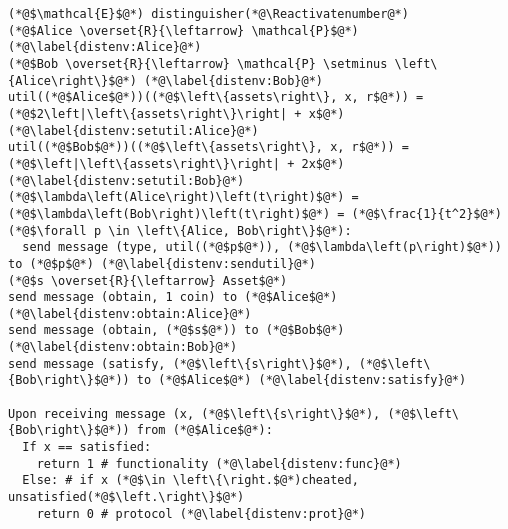 \Suppressnumber
\begin{lstlisting}[label=distenv, style=numbers]
(*@$\mathcal{E}$@*) distinguisher(*@\Reactivatenumber@*)
(*@$Alice \overset{R}{\leftarrow} \mathcal{P}$@*) (*@\label{distenv:Alice}@*)
(*@$Bob \overset{R}{\leftarrow} \mathcal{P} \setminus \left\{Alice\right\}$@*) (*@\label{distenv:Bob}@*)
util((*@$Alice$@*))((*@$\left\{assets\right\}, x, r$@*)) = (*@$2\left|\left\{assets\right\}\right| + x$@*) (*@\label{distenv:setutil:Alice}@*)
util((*@$Bob$@*))((*@$\left\{assets\right\}, x, r$@*)) = (*@$\left|\left\{assets\right\}\right| + 2x$@*) (*@\label{distenv:setutil:Bob}@*)
(*@$\lambda\left(Alice\right)\left(t\right)$@*) = (*@$\lambda\left(Bob\right)\left(t\right)$@*) = (*@$\frac{1}{t^2}$@*)
(*@$\forall p \in \left\{Alice, Bob\right\}$@*):
  send message (type, util((*@$p$@*)), (*@$\lambda\left(p\right)$@*)) to (*@$p$@*) (*@\label{distenv:sendutil}@*)
(*@$s \overset{R}{\leftarrow} Asset$@*)
send message (obtain, 1 coin) to (*@$Alice$@*) (*@\label{distenv:obtain:Alice}@*)
send message (obtain, (*@$s$@*)) to (*@$Bob$@*) (*@\label{distenv:obtain:Bob}@*)
send message (satisfy, (*@$\left\{s\right\}$@*), (*@$\left\{Bob\right\}$@*)) to (*@$Alice$@*) (*@\label{distenv:satisfy}@*)

Upon receiving message (x, (*@$\left\{s\right\}$@*), (*@$\left\{Bob\right\}$@*)) from (*@$Alice$@*):
  If x == satisfied:
    return 1 # functionality (*@\label{distenv:func}@*)
  Else: # if x (*@$\in \left\{\right.$@*)cheated, unsatisfied(*@$\left.\right\}$@*)
    return 0 # protocol (*@\label{distenv:prot}@*)
\end{lstlisting}

